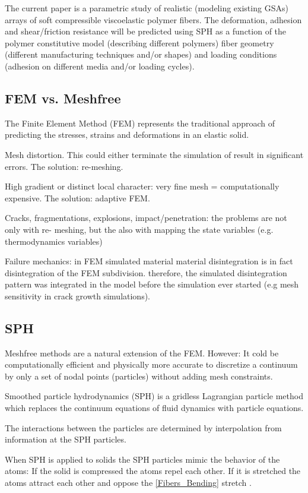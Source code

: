 The current paper is a parametric study of realistic (modeling existing GSAs) arrays of soft compressible viscoelastic polymer fibers. The deformation, adhesion and shear/friction resistance will be predicted using SPH as a function of the polymer constitutive model (describing different polymers) fiber geometry (different manufacturing techniques and/or shapes) and loading conditions (adhesion on different media and/or loading cycles). 

\subsection{FEM vs. Meshfree}
\label{FEM_vs_SPH}
The Finite Element Method (FEM) represents the traditional approach of predicting the stresses, strains and deformations in an elastic solid. 

\begin{packed_enum}
\item Mesh distortion. This could either terminate the simulation of result in significant errors. The solution: re-meshing.
\item High gradient or distinct local character: very fine mesh = computationally expensive. The solution: adaptive FEM.
\item Cracks, fragmentations, explosions, impact/penetration: the problems are not only with re- meshing, but the also with mapping the state variables (e.g. thermodynamics variables)
\item Failure mechanics: in FEM simulated material material disintegration is in fact disintegration of the FEM subdivision. therefore, the simulated disintegration pattern was integrated in the model before the simulation ever started (e.g mesh sensitivity in crack growth simulations). 
\end{packed_enum}

\subsection {SPH}
\label{SPH}
\begin{packed_item}
\item Meshfree methods are a natural extension of the FEM. However:
It cold be computationally efficient and physically more accurate to discretize a continuum by only a set of nodal points (particles) without adding mesh constraints.
\item Smoothed particle hydrodynamics (SPH) is a gridless Lagrangian particle method which replaces the continuum equations of fluid dynamics with particle equations.
\item The interactions between the particles are determined by interpolation from information at the SPH particles.
\item When SPH is applied to solids the SPH particles mimic the behavior of the atoms: If the solid is compressed the atoms repel each other. If it is stretched the atoms attract each other and oppose the \ref{Fibers_Bending} stretch \citealp{Tim_Good}.
\end{packed_item}



